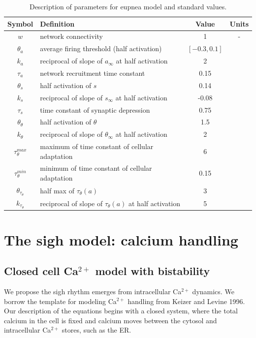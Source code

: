 \documentclass[12pt]{article}
\def\ca{Ca$^{2+}$\xspace}
\def\ainf{a_\infty}
\def\sinf{s_\infty}
\def\thetainf{\theta_\infty}
\def\tautheta{\tau_\theta}
\def\tauthetamax{\tau_\theta^{max}}
\def\tauthetamin{\tau_\theta^{min}}
\def\thetatheta{\theta_\theta}
\def\thetatautheta{\theta_{\tautheta}}
\def\ktautheta{k_{\tautheta}}
\begin{document}
\begin{table}[h!]
\centering 
\begin{tabular}{clcc}
    Symbol & Definition & Value  & Units \\
\hline 
\hline
$w$ & network connectivity & 1 &  - \\
\hline 
\hline 
$\theta_a$ & average firing threshold  (half activation) &  $[-0.3,0.1]$ & \\
$k_a$ & reciprocal of slope of $\ainf$ at half activation  & 2 &  \\
$\tau_a$ & network recruitment time constant  & 0.15  & \\
\hline 
$\theta_s$ & half activation of $s$ & 0.14 &  \\
$k_s$ & reciprocal of slope of $\sinf$ at half activation  & -0.08 &  \\
$\tau_s$ & time constant of synaptic depression   & 0.75 &  \\
\hline 
$\thetatheta$ & half activation of $\theta$ & 1.5 &  \\
$k_\theta$ & reciprocal of slope of $\thetainf$ at half activation  & 2 &  \\
\hline 
$\tauthetamax$ & maximum of time constant of cellular adaptation   & 6 &  \\
$\tauthetamin$ &  minimum of time constant of cellular adaptation   & 0.15 & \\
$\thetatautheta$ & half max of $\tautheta(a)$  & 3 &  \\
$\ktautheta$ & reciprocal of slope of $\tautheta(a)$ at half activation  & 5 &   \\
    \hline 
    \hline
\end{tabular}
\caption{Description of parameters for eupnea model and standard values.}
\label{ParamDefEupnea}
\end{table}

\clearpage          
\section*{The sigh model: calcium handling}

\subsection*{Closed cell Ca$^{2+}$ model with bistability}

We propose the sigh rhythm emerges from intracellular Ca$^{2+}$ dynamics. We borrow the template for modeling \ca handling from Keizer and Levine 1996. Our description of the equations begins with a closed system, where the total calcium in the cell is fixed and calcium moves between the cytosol and intracellular \ca stores, such as the ER.
\end{document}
